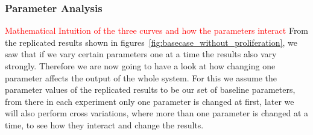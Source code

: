 \subsubsection{Parameter Analysis}

\textcolor{red}{Mathematical Intuition of the three curves and how the parameters interact}\newline 
From the replicated results shown in figures~\ref{fig:basecase_without_proliferation}, we saw that if we vary certain parameters one at a time the results also vary strongly. Therefore we are now going to have a look at how changing one parameter affects the output of the whole system. For this we assume the parameter values of the replicated results to be our set of baseline parameters, from there in each experiment only one parameter is changed at first, later we will also perform cross variations, where more than one parameter is changed at a time, to see how they interact and change the results. 


